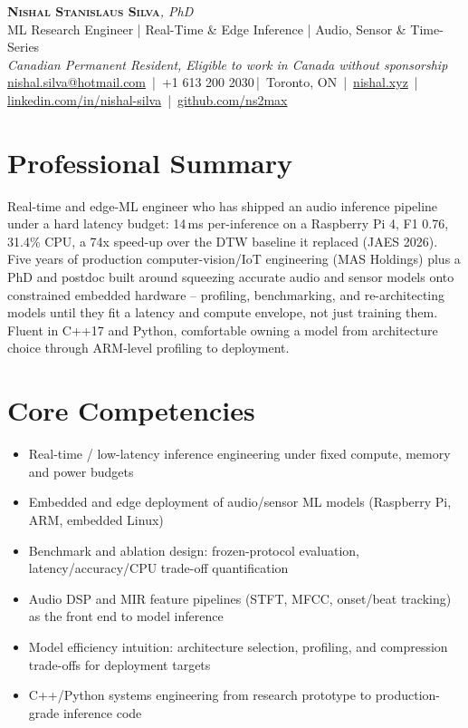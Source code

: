 \documentclass[11pt]{article}
\makeatletter
\newcommand{\cvName}{Nishal Stanislaus Silva}
\newcommand{\cvEmail}{nishal.silva@hotmail.com}
\newcommand{\cvPhone}{+1 613 200 2030}
\newcommand{\cvCity}{Toronto, ON}
\newcommand{\cvSite}{https://nishal.xyz}
\newcommand{\cvLinkedIn}{https://www.linkedin.com/in/nishal-silva}
\newcommand{\cvGitHub}{https://github.com/ns2max}
\newcommand{\cvStatus}{Canadian Permanent Resident, Eligible to work in Canada without sponsorship}
\newcommand{\cvTagline}{ML Research Engineer | Real-Time \& Edge Inference | Audio, Sensor \& Time-Series}
\makeatother
\begin{document}
\pagestyle{empty}
\begin{center}
    {\LARGE \scshape \textbf{\cvName}}{\large \textit{, PhD}}\\[1pt]
    {\small \cvTagline}\\[1pt]
    {\footnotesize\textit{\cvStatus}}\\[1pt]
    {\small
    \href{mailto:\cvEmail}{\cvEmail} \,|\, \cvPhone \,|\, \cvCity
    \,|\, \href{\cvSite}{nishal.xyz} \,|\, \href{\cvLinkedIn}{linkedin.com/in/nishal-silva}
    \,|\, \href{\cvGitHub}{github.com/ns2max}}
\end{center}

\section*{Professional Summary}
Real-time and edge-ML engineer who has shipped an audio inference pipeline under a hard latency budget: 14\,ms per-inference on a Raspberry Pi 4, F1 0.76, 31.4\% CPU, a 74x speed-up over the DTW baseline it replaced (JAES 2026). Five years of production computer-vision/IoT engineering (MAS Holdings) plus a PhD and postdoc built around squeezing accurate audio and sensor models onto constrained embedded hardware -- profiling, benchmarking, and re-architecting models until they fit a latency and compute envelope, not just training them. Fluent in C++17 and Python, comfortable owning a model from architecture choice through ARM-level profiling to deployment.

\section*{Core Competencies}
\begin{itemize}[leftmargin=1.4em, itemsep=-0.2em, topsep=0.1em]
    \item Real-time / low-latency inference engineering under fixed compute, memory and power budgets
    \item Embedded and edge deployment of audio/sensor ML models (Raspberry Pi, ARM, embedded Linux)
    \item Benchmark and ablation design: frozen-protocol evaluation, latency/accuracy/CPU trade-off quantification
    \item Audio DSP and MIR feature pipelines (STFT, MFCC, onset/beat tracking) as the front end to model inference
    \item Model efficiency intuition: architecture selection, profiling, and compression trade-offs for deployment targets
    \item C++/Python systems engineering from research prototype to production-grade inference code
\end{itemize}
\end{document}
